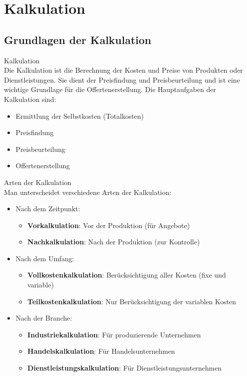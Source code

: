 \raggedcolumns

\section{Kalkulation}

\subsection{Grundlagen der Kalkulation}

\begin{definition}{Kalkulation}\\
Die Kalkulation ist die Berechnung der Kosten und Preise von Produkten oder Dienstleistungen. Sie dient der Preisfindung und Preisbeurteilung und ist eine wichtige Grundlage für die Offertenerstellung. Die Hauptaufgaben der Kalkulation sind:
\begin{itemize}
    \item Ermittlung der Selbstkosten (Totalkosten)
    \item Preisfindung
    \item Preisbeurteilung
    \item Offertenerstellung
\end{itemize}
\end{definition}

\begin{concept}{Arten der Kalkulation}\\
Man unterscheidet verschiedene Arten der Kalkulation:
\begin{itemize}
    \item Nach dem Zeitpunkt:
    \begin{itemize}
        \item \textbf{Vorkalkulation}: Vor der Produktion (für Angebote)
        \item \textbf{Nachkalkulation}: Nach der Produktion (zur Kontrolle)
    \end{itemize}
    \item Nach dem Umfang:
    \begin{itemize}
        \item \textbf{Vollkostenkalkulation}: Berücksichtigung aller Kosten (fixe und variable)
        \item \textbf{Teilkostenkalkulation}: Nur Berücksichtigung der variablen Kosten
    \end{itemize}
    \item Nach der Branche:
    \begin{itemize}
        \item \textbf{Industriekalkulation}: Für produzierende Unternehmen
        \item \textbf{Handelskalkulation}: Für Handelsunternehmen
        \item \textbf{Dienstleistungskalkulation}: Für Dienstleistungsunternehmen
    \end{itemize}
\end{itemize}
\end{concept}

